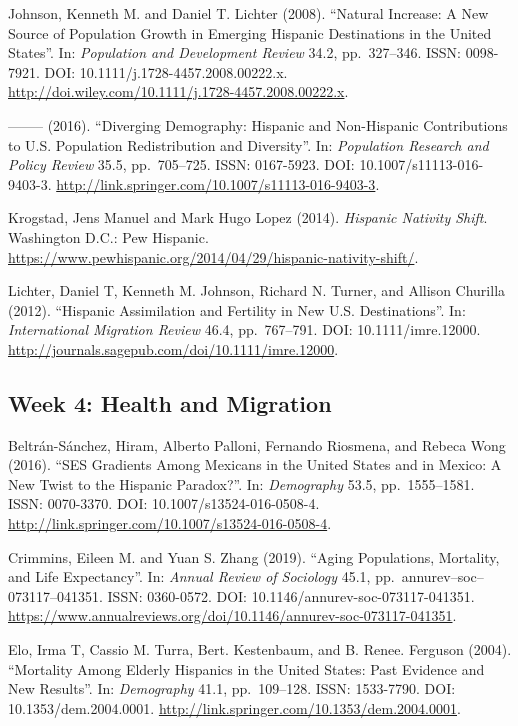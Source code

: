 \documentclass[11pt,]{article}
\begin{document}
Johnson, Kenneth M. and Daniel T. Lichter (2008). ``Natural Increase: A
New Source of Population Growth in Emerging Hispanic Destinations in the
United States''. In: \emph{Population and Development Review} 34.2,
pp.~327--346. ISSN: 0098-7921. DOI: 10.1111/j.1728-4457.2008.00222.x.
\url{http://doi.wiley.com/10.1111/j.1728-4457.2008.00222.x}.

-------- (2016). ``Diverging Demography: Hispanic and Non-Hispanic
Contributions to U.S. Population Redistribution and Diversity''. In:
\emph{Population Research and Policy Review} 35.5, pp.~705--725. ISSN:
0167-5923. DOI: 10.1007/s11113-016-9403-3.
\url{http://link.springer.com/10.1007/s11113-016-9403-3}.

Krogstad, Jens Manuel and Mark Hugo Lopez (2014).
\emph{Hispanic Nativity Shift}. Washington D.C.: Pew Hispanic.
\url{https://www.pewhispanic.org/2014/04/29/hispanic-nativity-shift/}.

Lichter, Daniel T, Kenneth M. Johnson, Richard N. Turner, and Allison
Churilla (2012). ``Hispanic Assimilation and Fertility in New U.S.
Destinations''. In: \emph{International Migration Review} 46.4,
pp.~767--791. DOI: 10.1111/imre.12000.
\url{http://journals.sagepub.com/doi/10.1111/imre.12000}.

\hypertarget{week-4-health-and-migration}{%
\subsection{Week 4: Health and
Migration}\label{week-4-health-and-migration}}

Beltrán-Sánchez, Hiram, Alberto Palloni, Fernando Riosmena, and Rebeca
Wong (2016). ``SES Gradients Among Mexicans in the United States and in
Mexico: A New Twist to the Hispanic Paradox?''. In: \emph{Demography}
53.5, pp.~1555--1581. ISSN: 0070-3370. DOI: 10.1007/s13524-016-0508-4.
\url{http://link.springer.com/10.1007/s13524-016-0508-4}.

Crimmins, Eileen M. and Yuan S. Zhang (2019). ``Aging Populations,
Mortality, and Life Expectancy''. In: \emph{Annual Review of Sociology}
45.1, pp.~annurev--soc--073117--041351. ISSN: 0360-0572. DOI:
10.1146/annurev-soc-073117-041351.
\url{https://www.annualreviews.org/doi/10.1146/annurev-soc-073117-041351}.

Elo, Irma T, Cassio M. Turra, Bert. Kestenbaum, and B. Renee. Ferguson
(2004). ``Mortality Among Elderly Hispanics in the United States: Past
Evidence and New Results''. In: \emph{Demography} 41.1, pp.~109--128.
ISSN: 1533-7790. DOI: 10.1353/dem.2004.0001.
\url{http://link.springer.com/10.1353/dem.2004.0001}.
\end{document}
